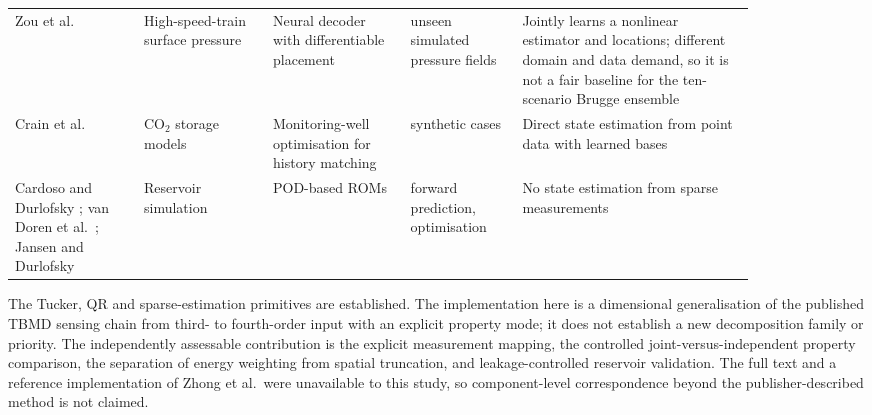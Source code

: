 \begin{table}[htbp]
\begin{tabular}{@{}p{0.15\linewidth}p{0.15\linewidth}p{0.16\linewidth}p{0.13\linewidth}p{0.27\linewidth}@{}}
Zou et al.\ \cite{zou2025prosnet} & High-speed-train surface pressure & Neural decoder with differentiable placement & unseen simulated pressure fields & Jointly learns a nonlinear estimator and locations; different domain and data demand, so it is not a fair baseline for the ten-scenario Brugge ensemble \\
Crain et al.\ \cite{crain2023} & CO$_2$ storage models & Monitoring-well optimisation for history matching & synthetic cases & Direct state estimation from point data with learned bases \\
Cardoso and Durlofsky \cite{cardoso2010}; van Doren et al.\ \cite{vandoren2006}; Jansen and Durlofsky \cite{jansen2017rom} & Reservoir simulation & POD-based ROMs & forward prediction, optimisation & No state estimation from sparse measurements \\
\bottomrule
\end{tabular}
\end{table}
The Tucker, QR and sparse-estimation primitives are established. The implementation here is a dimensional generalisation of the published TBMD sensing chain from third- to fourth-order input with an explicit property mode; it does not establish a new decomposition family or priority. The independently assessable contribution is the explicit measurement mapping, the controlled joint-versus-independent property comparison, the separation of energy weighting from spatial truncation, and leakage-controlled reservoir validation. The full text and a reference implementation of Zhong et al.\ were unavailable to this study, so component-level correspondence beyond the publisher-described method is not claimed.
